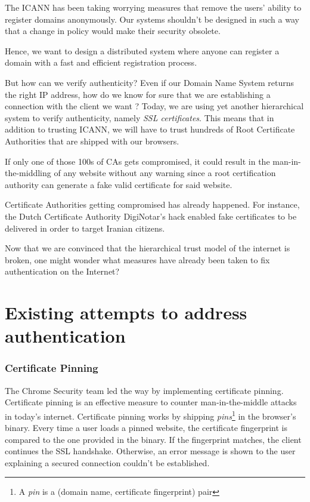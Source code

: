 \documentclass{vldb}
\begin{document}
The ICANN has been taking worrying measures that remove the users' ability to register domains anonymously\cite{icannabuse}. Our systems shouldn't be designed in such a way that a change in policy would make their security obsolete. 

Hence, we want to design a distributed system where anyone can register a domain with a fast and efficient registration process.

But how can we verify authenticity? 
Even if our Domain Name System returns the right IP address, how do we know for sure that we are establishing a connection with the client we want ? Today, we are using yet another hierarchical system to verify authenticity, namely \emph{SSL certificates}. This means that in addition to trusting ICANN, we will have to trust hundreds of Root Certificate Authorities that are shipped with our browsers.\cite{mozillaSSL}

If only one of those 100s of CAs gets compromised, it could result in the man-in-the-middling of any website without any warning since a root certification authority can generate a fake valid certificate for said website.

Certificate Authorities getting compromised has already happened. For instance, the Dutch Certificate Authority DigiNotar's hack \cite{diginotarHack} enabled fake certificates to be delivered in order to target Iranian citizens.

Now that we are convinced that the hierarchical trust model of the internet is broken, one might wonder what measures have already been taken to fix authentication on the Internet?

\section{Existing attempts to address authentication}

\subsubsection{Certificate Pinning}

The Chrome Security team led the way by implementing certificate pinning. Certificate pinning is an effective measure to counter man-in-the-middle attacks in today's internet. Certificate pinning works by shipping \emph{pins}\footnote{A \emph{pin} is a (domain name, certificate fingerprint) pair} in the browser's binary.\cite{chromiumPins} Every time a user loads a pinned website, the certificate fingerprint is compared to the one provided in the binary. If the fingerprint matches, the client continues the SSL handshake. Otherwise, an error message is shown to the user explaining a secured connection couldn't be established.
\end{document}
